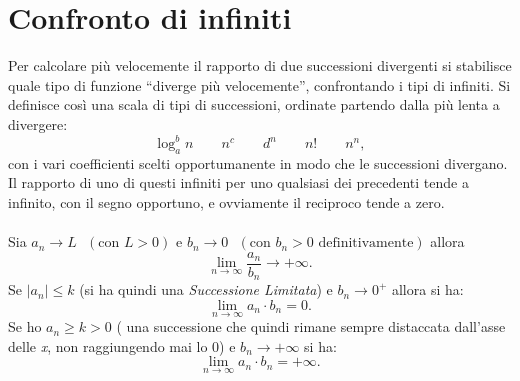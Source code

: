 \documentclass[a4paper,12pt, oneside]{book}
\begin{document}
\section{Confronto di infiniti} Per calcolare più velocemente il rapporto di due
successioni divergenti si stabilisce quale tipo di funzione ``diverge più
velocemente'', confrontando i tipi di infiniti. Si definisce così una scala di
tipi di successioni, ordinate partendo dalla più lenta a divergere:
$$\log_a^b n\qquad n^c\qquad d^n\qquad n!\qquad n^n,$$
con i vari coefficienti scelti opportumanente in modo che le successioni
divergano. Il rapporto di uno di questi infiniti per uno qualsiasi dei
precedenti tende a infinito, con il segno opportuno, e ovviamente il reciproco
tende a zero.\\\\ Sia $a_n \rightarrow L \mbox{ }(\mbox{con } L>0) \mbox { e }
b_n \rightarrow 0 \mbox{ }(\mbox{con } b_n>0 \mbox{ definitivamente})$
allora $$\lim_{n\rightarrow \infty}\frac{a_n}{b_n}\rightarrow +\infty.$$Se
$|a_n|\leq k$ (si ha quindi una \textit{Successione Limitata}) e $b_n
\rightarrow 0^{+}$ allora si ha: $$\lim_{n \rightarrow \infty} a_n\cdot b_n=0.$$
Se ho $a_n\geq k>0$ ( una successione che quindi rimane sempre distaccata
dall'asse delle \textit{x}, non raggiungendo mai lo 0) e $b_n\rightarrow
+\infty$ si ha: $$\lim_{n \rightarrow \infty} a_n\cdot b_n=+\infty.$$
\end{document}

